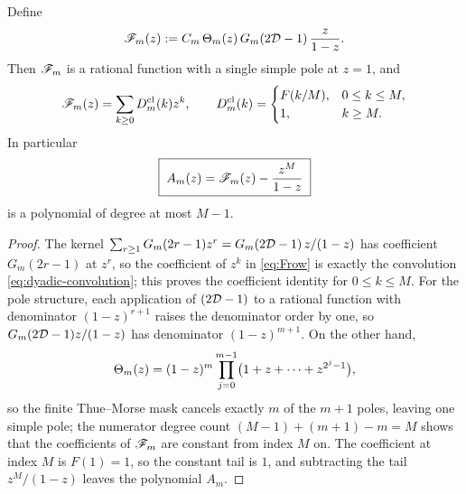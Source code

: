 \begin{theorem}
\label{thm:row-ogf}
Define
\begin{equation}
 \mathscr F_m(z)
 :=C_m\,\Theta_m(z)\,G_m(2\mathcal D-1)\,\frac{z}{1-z}.
 \label{eq:Frow}
\end{equation}
Then $\mathscr F_m$ is a rational function with a single simple pole at
$z=1$, and
\begin{equation}
 \mathscr F_m(z)=\sum_{k\ge0}D^{\mathrm{cl}}_m(k)z^{k},
 \qquad
 D^{\mathrm{cl}}_m(k)=
 \begin{cases}
 F(k/M),&0\le k\le M,\\
 1,&k\ge M.
 \end{cases}
 \label{eq:Frow-coeff}
\end{equation}
In particular
\begin{equation}
 \boxed{\;
 A_m(z)=\mathscr F_m(z)-\frac{z^{M}}{1-z}
 \;}
 \label{eq:AN-from-Frow}
\end{equation}
is a polynomial of degree at most $M-1$.
\end{theorem}

\begin{proof}
The kernel $\sum_{r\ge1}G_m(2r-1)z^{r}=G_m(2\mathcal D-1)\,z/(1-z)$ has
coefficient $G_m(2r-1)$ at $z^r$, so the coefficient of $z^k$ in
\eqref{eq:Frow} is exactly the convolution
\eqref{eq:dyadic-convolution}; this proves the coefficient identity for
$0\le k\le M$.  For the pole structure, each application of
$(2\mathcal D-1)$ to a rational function with denominator $(1-z)^{r+1}$
raises the denominator order by one, so
$G_m(2\mathcal D-1)z/(1-z)$ has denominator $(1-z)^{m+1}$.  On the other
hand,
\begin{equation}
 \Theta_m(z)=(1-z)^{m}
 \prod_{j=0}^{m-1}\bigl(1+z+\cdots+z^{2^{j}-1}\bigr),
 \label{eq:theta-factor}
\end{equation}
so the finite Thue--Morse mask cancels exactly $m$ of the $m+1$ poles,
leaving one simple pole; the numerator degree count
$(M-1)+(m+1)-m=M$ shows that the coefficients of $\mathscr F_m$ are constant
from index $M$ on.  The coefficient at index $M$ is $F(1)=1$, so the
constant tail is $1$, and subtracting the tail $z^{M}/(1-z)$ leaves the
polynomial $A_m$.
\end{proof}

